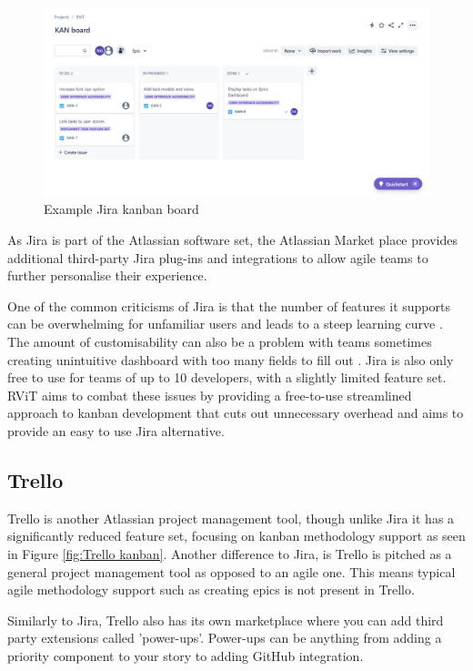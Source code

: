 \documentclass[l4proj.tex]{subfiles}
\begin{document}
\begin{figure}[h!]
\begin{center}
\includegraphics[scale=0.35]{dissertation/images/JiraKanbanBoard.png}
\caption{Example Jira kanban board}
\label{fig:Jira kanban} 
\end{center}
\end{figure}

As Jira is part of the Atlassian software set, the Atlassian Market place provides additional third-party Jira plug-ins and integrations to allow agile teams to further personalise their experience.  

One of the common criticisms of Jira is that the number of features it supports can be overwhelming for unfamiliar users and leads to a steep learning curve \cite{JiraProblemsFeatures}. The amount of customisability can also be a problem with teams sometimes creating unintuitive dashboard with too many fields to fill out \cite{JiraProblemsFlexible}. Jira is also only free to use for teams of up to 10 developers, with a slightly limited feature set. RViT aims to combat these issues by providing a free-to-use streamlined approach to kanban development that cuts out unnecessary overhead and aims to provide an easy to use Jira alternative. 


\subsection{Trello}
Trello is another Atlassian project management tool, though unlike Jira it has a significantly reduced feature set, focusing on kanban methodology support as seen in Figure \ref{fig:Trello kanban}. Another difference to Jira, is Trello is pitched as a general project management tool as opposed to an agile one. This means typical agile methodology support such as creating epics is not present in Trello.

Similarly to Jira, Trello also has its own marketplace where you can add third party extensions called 'power-ups'. Power-ups can be anything from adding a priority component to your story to adding GitHub integration.
\end{document}
